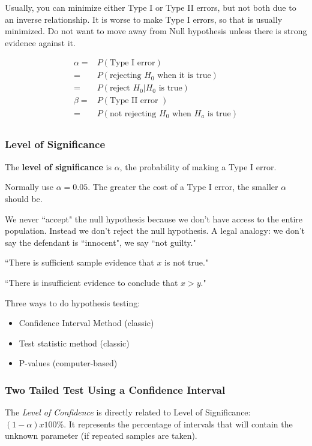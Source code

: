 \documentclass[11pt, oneside]{article}   	%
\begin{document}
Usually, you can minimize either Type I or Type II errors, but not both due to an inverse relationship. It is worse to make Type I errors, so that is usually minimized. Do not want to move away from Null hypothesis unless there is strong evidence against it.

\begin{align*}
\alpha =& P(\text{Type I error}) \\
	   =& P(\text{rejecting } H_0 \text{ when it is true}) \\
	   =& P(\text{reject } H_0 | H_0 \text{ is true}) \\
\beta =& P(\text{Type II error }) \\
	   =& P(\text{not rejecting } H_0 \text{ when } H_a \text{ is true}) \\
\end{align*}

\subsubsection{Level of Significance}

The \textbf{level of significance} is $\alpha$, the probability of making a Type I error.

Normally use $\alpha = 0.05$. The greater the cost of a Type I error, the smaller $\alpha$ should be.

We never ``accept" the null hypothesis because we don't have access to the entire population. Instead we don't reject the null hypothesis. A legal analogy: we don't say the defendant is ``innocent", we say ``not guilty."

``There is sufficient sample evidence that $x$ is not true." 

``There is insufficient evidence to conclude that $x > y$."

Three ways to do hypothesis testing:
\begin{itemize}
\item{Confidence Interval Method (classic)}
\item{Test statistic method (classic)}
\item{P-values (computer-based)}
\end{itemize}

\subsubsection{Two Tailed Test Using a Confidence Interval}

The \textit{Level of Confidence} is directly related to Level of Significance: $(1-\alpha) x 100\%$. It represents the percentage of intervals that will contain the unknown parameter (if repeated samples are taken).
\end{document}
